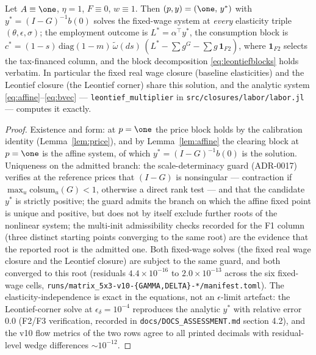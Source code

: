 \begin{proposition}\label{prop:gd}
Let $A \equiv \one$, $\eta = 1$, $F \equiv 0$, $w \equiv 1$. Then
$(p,y) = (\one,\, y^{\ast})$ with
$y^{\ast} = (I - G)^{-1} b(0)$ solves the fixed-wage system at
\emph{every} elasticity triple $(\theta,\epsilon,\sigma)$; the employment
outcome is $L^{\ast} = \alpha^{\!\top} y^{\ast}$, the consumption block is
$c^{\ast} = (1-s)\,\mathrm{diag}(1-m)\,\tilde\omega(ds)\,
(L^{\ast} - \sum g^G - \sum g\,\mathbf{1}_{F2})$, where
$\mathbf{1}_{F2}$ selects the tax-financed column, and the block
decomposition \eqref{eq:leontiefblocks} holds verbatim. In particular the
fixed real wage closure (baseline
elasticities) and the Leontief closure (the Leontief corner) share this
solution, and the
analytic system \eqref{eq:affine}--\eqref{eq:bvec} ---
\texttt{leontief\_multiplier} in \texttt{src/closures/labor/labor.jl} ---
computes it exactly.
\end{proposition}

\begin{proof}
Existence and form: at $p = \one$ the price block holds by the calibration
identity (Lemma~\ref{lem:price}), and by Lemma~\ref{lem:affine} the
clearing block at $p = \one$ is the affine system, of which
$y^{\ast} = (I-G)^{-1}b(0)$ is the solution. Uniqueness on the admitted
branch: the scale-determinacy guard (ADR-0017) verifies at the reference
prices that $(I - G)$ is nonsingular --- contraction if
$\max_u \mathrm{colsum}_u(G) < 1$, otherwise a direct rank test --- and
that the candidate $y^{\ast}$ is strictly positive;
the guard admits the branch on which the affine fixed
point is unique and positive, but does not by itself exclude further roots of
the nonlinear system; the multi-init admissibility checks recorded for the F1
column (three distinct starting points converging to the same root) are the
evidence that the reported root is the admitted one. Both fixed-wage solves
(the fixed real wage closure and the Leontief closure) are subject to the
same guard, and both converged to this root
(residuals $4.4\times10^{-16}$ to $2.0\times10^{-13}$
across the six fixed-wage cells,
\texttt{runs/matrix\_5x3-v10-\{GAMMA,DELTA\}-*/manifest.toml}). The
elasticity-independence is exact in the equations, not an $\epsilon$-limit
artefact: the Leontief-corner solve at $\epsilon_\delta = 10^{-4}$
reproduces the
analytic $y^{\ast}$ with relative error $0.0$ (F2/F3 verification, recorded
in \texttt{docs/DOCS\_ASSESSMENT.md} section 4.2), and the v10 flow metrics
of the two rows agree to all printed decimals with residual-level wedge
differences $\sim 10^{-12}$.
\end{proof}

